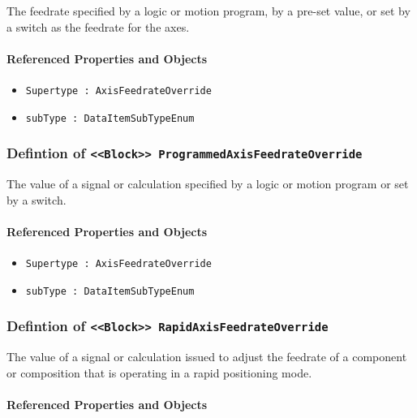 \FloatBarrier

The feedrate specified by a logic or motion program, by a pre-set value, or set by a switch as the feedrate for the axes. 

\FloatBarrier
\paragraph{Referenced Properties and Objects}

\begin{itemize}
\item \texttt{Supertype : AxisFeedrateOverride}

\item \texttt{subType : DataItemSubTypeEnum}

\end{itemize}
\FloatBarrier
\subsubsection{Defintion of \texttt{<<Block>> ProgrammedAxisFeedrateOverride}}
  \label{type:ProgrammedAxisFeedrateOverride}

\FloatBarrier

The value of a signal or calculation specified by a logic or motion program or set by a switch.

\FloatBarrier
\paragraph{Referenced Properties and Objects}

\begin{itemize}
\item \texttt{Supertype : AxisFeedrateOverride}

\item \texttt{subType : DataItemSubTypeEnum}

\end{itemize}
\FloatBarrier
\subsubsection{Defintion of \texttt{<<Block>> RapidAxisFeedrateOverride}}
  \label{type:RapidAxisFeedrateOverride}

\FloatBarrier

The value of a signal or calculation issued to adjust the feedrate of a component or composition that is operating in a rapid positioning mode.

\FloatBarrier
\paragraph{Referenced Properties and Objects}

